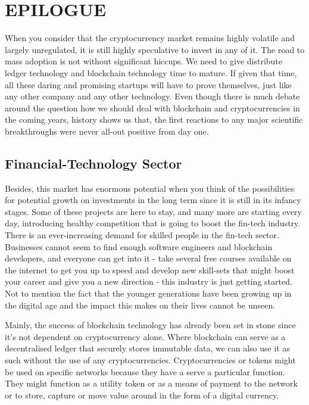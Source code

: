 \chapter{EPILOGUE}
\label{ch:epilogue}

When you consider that the cryptocurrency market remains highly volatile and largely unregulated, it is still highly speculative to invest in any of it. The road to mass adoption is not without significant hiccups. We need to give distribute ledger technology and blockchain technology time to mature. If given that time, all these daring and promising startups will have to prove themselves, just like any other company and any other technology. Even though there is much debate around the question how we should deal with blockchain and cryptocurrencies in the coming years, history shows us that, the first reactions to any major scientific breakthroughs were never all-out positive from day one.\medskip


\section*{Financial-Technology Sector}
Besides, this market has enormous potential when you think of the possibilities for potential growth on investments in the long term since it is still in its infancy stages. Some of these projects are here to stay, and many more are starting every day, introducing healthy competition that is going to boost the fin-tech industry. There is an ever-increasing demand for skilled people in the fin-tech sector. Businesses cannot seem to find enough software engineers and blockchain developers, and everyone can get into it - take several free courses available on the internet to get you up to speed and develop new skill-sets that might boost your career and give you a new direction - this industry is just getting started. Not to mention the fact that the younger generations have been growing up in the digital age and the impact this makes on their lives cannot be unseen.\medskip

Mainly, the success of blockchain technology has already been set in stone since it's not dependent on cryptocurrency alone. Where blockchain can serve as a decentralised ledger that securely stores immutable data, we can also use it as such without the use of any cryptocurrencies. Cryptocurrencies or tokens might be used on specific networks because they have a serve a particular function. They might function as a utility token or as a means of payment to the network or to store, capture or move value around in the form of a digital currency.\medskip


